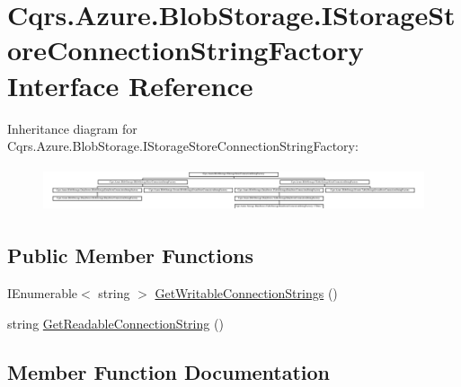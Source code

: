 \hypertarget{interfaceCqrs_1_1Azure_1_1BlobStorage_1_1IStorageStoreConnectionStringFactory}{}\section{Cqrs.\+Azure.\+Blob\+Storage.\+I\+Storage\+Store\+Connection\+String\+Factory Interface Reference}
\label{interfaceCqrs_1_1Azure_1_1BlobStorage_1_1IStorageStoreConnectionStringFactory}
Inheritance diagram for Cqrs.\+Azure.\+Blob\+Storage.\+I\+Storage\+Store\+Connection\+String\+Factory\+:\begin{figure}[H]
\begin{center}
\leavevmode
\includegraphics[height=1.318267cm]{interfaceCqrs_1_1Azure_1_1BlobStorage_1_1IStorageStoreConnectionStringFactory}
\end{center}
\end{figure}
\subsection*{Public Member Functions}
\begin{DoxyCompactItemize}
\item 
I\+Enumerable$<$ string $>$ \hyperlink{interfaceCqrs_1_1Azure_1_1BlobStorage_1_1IStorageStoreConnectionStringFactory_a26ecfd0805fe3d525e9fa419330bd140_a26ecfd0805fe3d525e9fa419330bd140}{Get\+Writable\+Connection\+Strings} ()
\item 
string \hyperlink{interfaceCqrs_1_1Azure_1_1BlobStorage_1_1IStorageStoreConnectionStringFactory_a0ed836289e048767f753630bbcc98d5d_a0ed836289e048767f753630bbcc98d5d}{Get\+Readable\+Connection\+String} ()
\end{DoxyCompactItemize}


\subsection{Member Function Documentation}
\mbox{\label{interfaceCqrs_1_1Azure_1_1BlobStorage_1_1IStorageStoreConnectionStringFactory_a0ed836289e048767f753630bbcc98d5d_a0ed836289e048767f753630bbcc98d5d}} 
